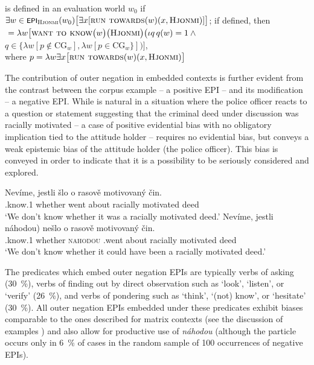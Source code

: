 \documentclass[output=paper,colorlinks,citecolor=brown]{langscibook}
\begin{document}
\ea{} is defined in an evaluation world $w_0$ if $\exists w\in\cnst{epi}_{\textsc{Hjonmi}}(w_0)\big[\exists x[\textsc{run towards}(w)(x,\textsc{Hjonmi})]\big]$; if defined, then\label{sim:denot:epi}\\
${}=\lambda w\big[\textsc{want to know}\big(w\big)\big(\textsc{Hjonmi}\big)\big(\iota q\,q(w)=1\wedge{}$\\
\tabto{3cm}$q\in\{\lambda w[p\not\in\text{CG}_w],\lambda w[p\in\text{CG}_w\}]\big)\big]$,\\
where $p=\lambda w\exists x\big[\textsc{run towards}(w)(x,\textsc{Hjonmi})\big]$
\z

\noindent The contribution of outer negation in embedded contexts is further evident from the contrast between the corpus example  -- a positive EPI -- and its modification  -- a negative EPI. While  is natural in a situation where the police officer reacts to a question or statement suggesting that the criminal deed under discussion was racially motivated -- a case of positive evidential bias with no obligatory implication tied to the attitude holder --  requires no evidential bias, but conveys a weak epistemic bias of the attitude holder (the police officer). This bias is conveyed in order to indicate that it is a possibility to be seriously considered and explored.

\ea\label{sim:ex:deed}\ea\gll Nevíme, jestli šlo o rasově motivovaný čin.\label{sim:ex:deed-a}\\
{\NEG}.know.{1\PL} whether went about racially motivated deed\\
\glt `We don't know whether it was a racially motivated deed.'
\ex\gll Nevíme, jestli \minsp{(} náhodou) nešlo o rasově motivovaný čin.\label{sim:ex:deed-b}\\
{\NEG}.know.{1\PL} whether {} \textsc{nahodou} {\NEG}.went about racially motivated deed\\
\glt `We don't know whether it could have been a racially motivated deed.'
\z\z

\noindent The predicates which embed outer negation EPIs are typically verbs of asking (\qty{30}{\percent}), verbs of finding out by direct observation such as `look', `listen', or `verify' (\qty{26}{\percent}), and verbs of pondering such as `think', `(not) know', or `hesitate' (\qty{30}{\percent}). All outer negation EPIs embedded under these predicates exhibit biases comparable to the ones described for matrix contexts (see the discussion of examples ) and also allow for productive use of \textit{náhodou} (although the particle occurs only in \qty{6}{\percent} of cases in the random sample of 100 occurrences of negative EPIs). 
\end{document}
